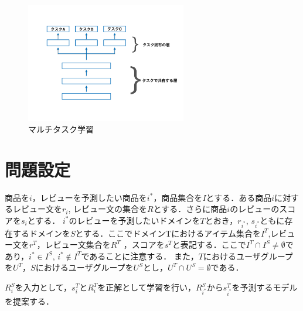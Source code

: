\documentclass[dvipdfmx,twocolumn,10.5pt]{jsarticle}
\begin{document}
\begin{figure}[tb]
	\centering
	\includegraphics[width=7cm]{images/multitask_learning_example.pdf} 
	\caption{マルチタスク学習}
	\label{multitask_learning}
\end{figure}

\section{問題設定}
商品を$i$，レビューを予測したい商品を$i^*$，商品集合を$I$とする．ある商品$i$に対するレビュー文を$r_i$, レビュー文の集合を$R$とする．さらに商品$i$のレビューのスコアを$s_i$とする．
$i^*$のレビューを予測したいドメインを$T$とおき，$r_{i^*}$, $s_{i^*}$ともに存在するドメインを$S$とする．ここでドメインTにおけるアイテム集合を$I^T$,レビュー文を$r^T$，レビュー文集合を$R^T$ ，スコアを$s^T$と表記する．ここで$I^T \cap I^S \neq \emptyset$であり，$i^* \in I^S$, $i^* \notin I^T$であることに注意する．
また，$T$におけるユーザグループを$U^T$，$S$におけるユーザグループを$U^S$とし，$U^T \cap U^S = \emptyset $である．

$R^S_i$を入力として，$s^T_i$と$R^T_i$を正解として学習を行い，$R^S_{i^*}$から$s^T_{i^*}$を予測するモデルを提案する．
\end{document}

